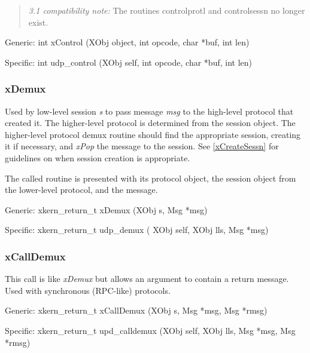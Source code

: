 \begin{quote}
{\em 3.1 compatibility note:} The routines controlprotl and controlsessn
no longer exist.
\end{quote}
\medskip

{\sanss Generic:} {\sem int} {\bold xControl} ({\sem XObj} {\caps object}, 
{\sem int} {\caps opcode}, {\sem char} *{\caps buf}, {\sem int} {\caps len})
\medskip

{\sanss Specific:} {\sem int} {\bold udp\_control} ({\sem XObj} {\caps self}, {\sem int} {\caps opcode}, {\sem char} *{\caps buf}, {\sem int} {\caps len})

\subsubsection{xDemux}

\noindent Used by low-level session {\em s} to pass message {\em msg}
to the high-level protocol that created it.  The higher-level protocol
is determined from the session object.  The higher-level protocol
demux routine should find the appropriate session, creating it if
necessary, and {\em xPop} the message to the session. See
\ref{xCreateSessn} for guidelines on when session creation is
appropriate.

The called routine is presented with its protocol object, the session
object from the lower-level protocol, and the message.
\medskip

{\sanss Generic:} {\sem xkern\_return\_t} {\bold xDemux} ({\sem XObj} {\caps s}, {\sem Msg} *{\caps msg})
\medskip

{\sanss Specific:} {\sem xkern\_return\_t} {\bold udp\_demux} ({\sem
XObj} {\caps self}, {\sem XObj} {\caps lls}, {\sem Msg} *{\caps msg})

\subsubsection{xCallDemux}

This call is like {\em xDemux} but allows an argument to contain a
return message. Used with synchronous (RPC-like) protocols.
\medskip

{\sanss Generic:} {\sem xkern\_return\_t} {\bold xCallDemux} ({\sem XObj} {\caps s}, {\sem Msg} *{\caps msg}, {\sem Msg} *{\caps rmsg})
\medskip

{\sanss Specific:} {\sem xkern\_return\_t} {\bold upd\_calldemux}
({\sem XObj} {\caps self}, {\sem XObj} {\caps lls}, {\sem Msg} *{\caps msg}, {\sem Msg} *{\caps rmsg})

